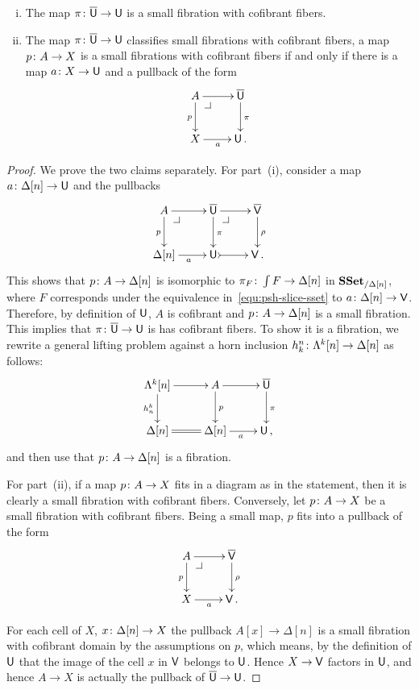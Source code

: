 \documentclass[reqno,10pt,a4paper,oneside,draft]{amsart}
\begin{document}
\begin{proposition} \label{thm:universe-u}  \hfill 
\begin{enumerate}[(i)] 
\item The map $\pi \colon \overline{\mathsf{U}} \to \mathsf{U}$ is a small fibration with cofibrant fibers.
\item The map $\pi \colon \overline{\mathsf{U}} \to \mathsf{U}$ classifies small fibrations with cofibrant fibers, \ie 
a map $p \colon A \to X$ is a small fibrations with cofibrant fibers if and only if 
there is a map $a \colon X \to \mathsf{U}$ and a pullback  of the form
\[
\xymatrix{
A \ar[r] \ar[d]_p \drpullback & \UU \ar[d]^\pi \\
X \ar[r]_{a} & \U \, . }
\]
\end{enumerate}
\end{proposition}

\begin{proof} We prove the two claims separately.
For part~(i), consider a map $a \colon \Delta[n] \rightarrow \mathsf{U}$ and the pullbacks
\[
\xymatrix{
A \ar[r] \ar[d]_p  \drpullback & \UU \ar[d]^{\pi} \ar[r]  \drpullback & \VV \ar[d]^{\rho} \\
\Delta[n] \ar[r]_{a} & \U \ar@{>->}[r] & \V \, . }
\]
This shows that $p \colon A \rightarrow \Delta[n]$ is isomorphic to $\pi_F \colon \int F \rightarrow \Delta[n]$ in $\mathbf{SSet}_{/ \Delta[n]}$, where $F$ corresponds under the equivalence in~\eqref{equ:psh-slice-sset} to 
$a \colon \Delta[n] \rightarrow \mathsf{V}$. Therefore, by definition of $\mathsf{U}$, $A$ is cofibrant and $p \colon A \rightarrow \Delta[n]$ is a small fibration. This implies that $\pi \colon \overline{\mathsf{U}} \rightarrow \mathsf{U}$ is has cofibrant fibers. To show it is a fibration, we rewrite a general lifting problem against a horn inclusion $h^n_k \colon \Lambda^k[n] \rightarrow \Delta[n]$ as follows:
\[
\xymatrix{
\Lambda^k[n] \ar[r] \ar[d]_{h^k_n} & A  \ar[d]^{p} \ar[r] & \UU \ar[d]^\pi \\
\Delta[n] \ar@{=}[r]  & \Delta[n] \ar[r]_a & \U \, ,  }
\]
and then use that $p \colon A  \to \Delta[n]$ is a fibration.

For part~(ii), if a map $p \colon A \to X$ fits in a diagram as in the statement, then it is clearly a small fibration with
cofibrant fibers. Conversely, let $p \colon A \to X$ be a small fibration with cofibrant fibers. Being a small 
map, $p$ fits into a pullback of the form 
\[
\xymatrix{
A \ar[r] \ar[d]_p \drpullback  &  \VV \ar[d]^{\rho} \\
X \ar[r]_{a} & \V \, . }
\]

For each cell of $X$,  $x \colon \Delta[n] \rightarrow X$ the pullback $A[x] \rightarrow \Delta[n]$ is a small fibration with cofibrant domain by the assumptions on $p$, which means, by the definition of $\mathsf{U}$ that the image of the cell $x$ in $\mathsf{V}$ belongs to $\mathsf{U}$. Hence $X \rightarrow \mathsf{V}$ factors in $\mathsf{U}$, and hence $A \rightarrow X$ is actually the pullback of $\overline{\mathsf{U}} \rightarrow \mathsf{U}$. \qedhere
\end{proof} 
\end{document}
